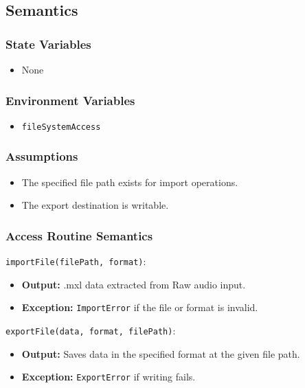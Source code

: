 \documentclass[12pt, titlepage]{article}
\begin{document}
\subsection{Semantics}  

\subsubsection{State Variables}  
\begin{itemize}  
    \item None  
\end{itemize}  

\subsubsection{Environment Variables}  
\begin{itemize}  
    \item \texttt{fileSystemAccess}  
\end{itemize}  

\subsubsection{Assumptions}  
\begin{itemize}  
    \item The specified file path exists for import operations.  
    \item The export destination is writable.  
\end{itemize}  

\subsubsection{Access Routine Semantics}  

\noindent \texttt{importFile(filePath, format)}:
\begin{itemize}  
    \item \textbf{Output:} .mxl data extracted from Raw audio input.  
    \item \textbf{Exception:} \texttt{ImportError} if the file or format is invalid.  
\end{itemize}  

\noindent \texttt{exportFile(data, format, filePath)}:
\begin{itemize}  
    \item \textbf{Output:} Saves data in the specified format at the given file path.  
    \item \textbf{Exception:} \texttt{ExportError} if writing fails.  
\end{itemize}  
\end{document}
